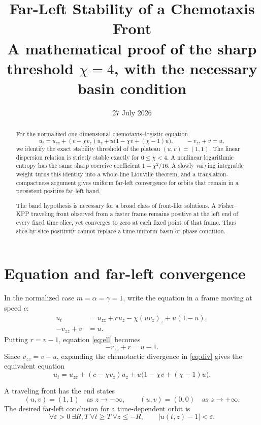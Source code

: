\documentclass[11pt]{article}
\title{Far-Left Stability of a Chemotaxis Front\\
\large A mathematical proof of the sharp threshold \(\chi=4\), with the
necessary basin condition}
\author{}
\date{27 July 2026}
\newcommand{\abs}[1]{\left\lvert #1\right\rvert}
\begin{document}
\maketitle

\begin{abstract}
For the normalized one-dimensional chemotaxis--logistic equation
\[
 u_t=u_{zz}+(c-\chi v_z)u_z
      +u\bigl(1-\chi v+(\chi-1)u\bigr),
 \qquad -v_{zz}+v=u,
\]
we identify the exact stability threshold of the plateau
\((u,v)=(1,1)\).  The linear dispersion relation is strictly stable exactly
for \(0\le\chi<4\).  A nonlinear logarithmic entropy has the same sharp
coercive coefficient \(1-\chi^2/16\).  A slowly varying integrable weight
turns this identity into a whole-line Liouville theorem, and a
translation-compactness argument gives uniform far-left convergence for
orbits that remain in a persistent positive far-left band.

The band hypothesis is necessary for a broad class of front-like solutions.
A Fisher--KPP traveling front observed from a faster frame remains positive
at the left end of every fixed time slice, yet converges to zero at each
fixed point of that frame.  Thus slice-by-slice positivity cannot replace a
time-uniform basin or phase condition.
\end{abstract}

\tableofcontents

\section{Equation and far-left convergence}

In the normalized case \(m=\alpha=\gamma=1\), write the equation in a frame
moving at speed \(c\):
\begin{align}
 u_t
 &=u_{zz}+cu_z-\chi(uv_z)_z+u(1-u),                    \label{eq:div}\\
 -v_{zz}+v&=u.                                         \label{eq:ell}
\end{align}
Putting \(r=v-1\), equation \eqref{eq:ell} becomes
\[
 -r_{zz}+r=u-1.
\]
Since \(v_{zz}=v-u\), expanding the chemotactic divergence in
\eqref{eq:div} gives the equivalent equation
\[
 u_t=u_{zz}+(c-\chi v_z)u_z
      +u\bigl(1-\chi v+(\chi-1)u\bigr).
\]

A traveling front has the end states
\[
 (u,v)=(1,1)\quad\text{as }z\to-\infty,
 \qquad
 (u,v)=(0,0)\quad\text{as }z\to+\infty.
\]
The desired far-left conclusion for a time-dependent orbit is
\begin{equation}
 \forall\varepsilon>0\ \exists R,T\
 \forall t\ge T\ \forall z\le-R,\qquad
 \abs{u(t,z)-1}<\varepsilon.                            \label{eq:goal}
\end{equation}
\end{document}
